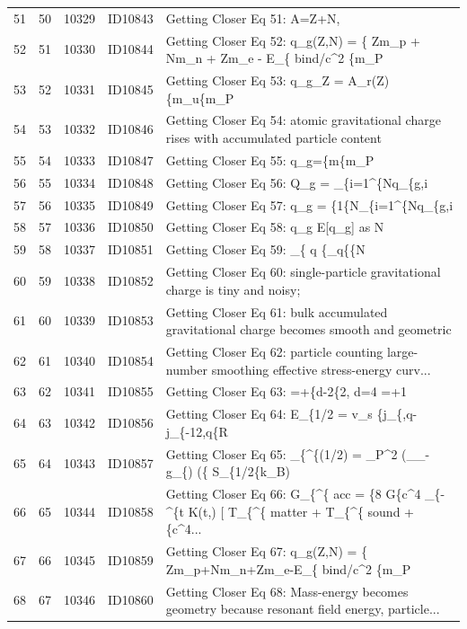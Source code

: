\documentclass[11pt]{article}
\theoremstyle{remark}
\begin{document}
\begin{table}[H]
\begin{tabularx}{\textwidth}{rrrrL{7.2cm}}
51 & 50 & 10329 & ID10843 & Getting Closer Eq 51: A=Z+N, \\
52 & 51 & 10330 & ID10844 & Getting Closer Eq 52: q\_g(Z,N) = \{ Zm\_p + Nm\_n + Zm\_e - E\_\{ bind/c\textasciicircum{}2 \{m\_P \\
53 & 52 & 10331 & ID10845 & Getting Closer Eq 53: q\_g\_Z = A\_r(Z)\{m\_u\{m\_P \\
54 & 53 & 10332 & ID10846 & Getting Closer Eq 54: atomic gravitational charge rises with accumulated particle content \\
55 & 54 & 10333 & ID10847 & Getting Closer Eq 55: q\_g=\{m\{m\_P \\
56 & 55 & 10334 & ID10848 & Getting Closer Eq 56: Q\_g = \_\{i=1\textasciicircum{}\{Nq\_\{g,i \\
57 & 56 & 10335 & ID10849 & Getting Closer Eq 57: q\_g = \{1\{N\_\{i=1\textasciicircum{}\{Nq\_\{g,i \\
58 & 57 & 10336 & ID10850 & Getting Closer Eq 58: q\_g E[q\_g] as N \\
59 & 58 & 10337 & ID10851 & Getting Closer Eq 59: \_\{ q \{\_q\{\{N \\
60 & 59 & 10338 & ID10852 & Getting Closer Eq 60: single-particle gravitational charge is tiny and noisy; \\
61 & 60 & 10339 & ID10853 & Getting Closer Eq 61: bulk accumulated gravitational charge becomes smooth and geometric \\
62 & 61 & 10340 & ID10854 & Getting Closer Eq 62: particle counting large-number smoothing effective stress-energy curv... \\
63 & 62 & 10341 & ID10855 & Getting Closer Eq 63: =+\{d-2\{2, d=4 =+1 \\
64 & 63 & 10342 & ID10856 & Getting Closer Eq 64: E\_\{1/2 = v\_s \{j\_\{,q-j\_\{-12,q\{R \\
65 & 64 & 10343 & ID10857 & Getting Closer Eq 65: \_\{\textasciicircum{}\{(1/2) = \_P\textasciicircum{}2 (\_\_-g\_\{) (\{ S\_\{1/2\{k\_B) \\
66 & 65 & 10344 & ID10858 & Getting Closer Eq 66: G\_\{\textasciicircum{}\{ acc = \{8 G\{c\textasciicircum{}4 \_\{-\textasciicircum{}\{t K(t,) [ T\_\{\textasciicircum{}\{ matter + T\_\{\textasciicircum{}\{ sound + \{c\textasciicircum{}4... \\
67 & 66 & 10345 & ID10859 & Getting Closer Eq 67: q\_g(Z,N) = \{ Zm\_p+Nm\_n+Zm\_e-E\_\{ bind/c\textasciicircum{}2 \{m\_P \\
68 & 67 & 10346 & ID10860 & Getting Closer Eq 68: Mass-energy becomes geometry because resonant field energy, particle... \\
\bottomrule
\end{tabularx}
\end{table}
\end{document}
